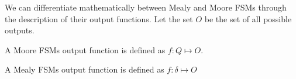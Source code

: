 We can differentiate mathematically between Mealy and Moore FSMs through the description of their output functions. Let the set $O$ be the set of all possible outputs.
\begin{bullets}
	\item A Moore FSMs output function is defined as $f: Q \mapsto O$.
	\item A Mealy FSMs output function is defined as $f: \delta \mapsto O$
\end{bullets}